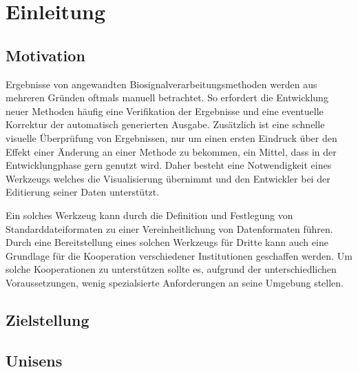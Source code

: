 \chapter{Einleitung}

\section{Motivation}

Ergebnisse von angewandten Biosignalverarbeitungsmethoden werden aus mehreren Gr\"unden oftmals manuell betrachtet.
So erfordert die Entwicklung neuer Methoden h\"aufig eine Verifikation der Ergebnisse und eine eventuelle Korrektur der automatisch generierten Ausgabe.
Zus\"atzlich ist eine schnelle visuelle \"Uberpr\"ufung von Ergebnissen, nur um einen ersten Eindruck \"uber den Effekt einer \"Anderung an einer Methode zu bekommen, ein Mittel, dass in der Entwicklungphase gern genutzt wird.
Daher besteht eine Notwendigkeit eines Werkzeugs welches die Visualisierung \"ubernimmt und den Entwickler bei der Editierung seiner Daten unterst\"utzt.

Ein solches Werkzeug kann durch die Definition und Festlegung von Standarddateiformaten zu einer Vereinheitlichung von Datenformaten f\"uhren.
Durch eine Bereitstellung eines solchen Werkzeugs f\"ur Dritte kann auch eine Grundlage f\"ur die Kooperation verschiedener Institutionen geschaffen werden.
Um solche Kooperationen zu unterst\"utzen sollte es, aufgrund der unterschiedlichen Voraussetzungen, wenig spezialsierte Anforderungen an seine Umgebung stellen.

\section{Zielstellung}



\section{Unisens}

